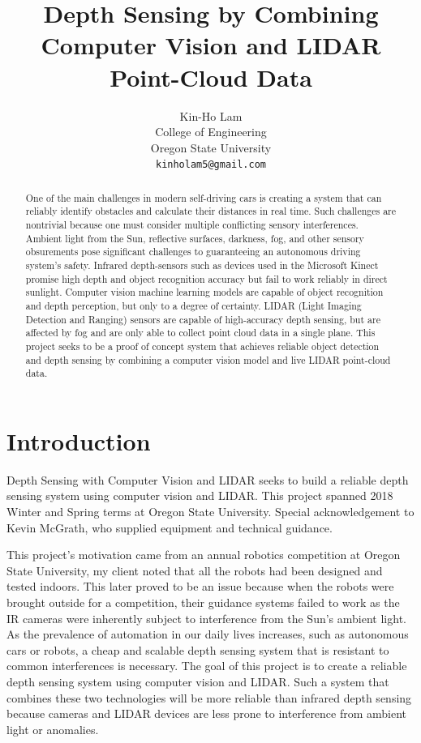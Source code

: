 \documentclass{article}
\title{Depth Sensing by Combining Computer Vision and LIDAR Point-Cloud Data}
\date{}
\author{
  Kin-Ho Lam\\
  College of Engineering\\
  Oregon State University \\
  \texttt{kinholam5@gmail.com}\\
}
\begin{document}
\maketitle

\begin{abstract}
  One of the main challenges in modern self-driving cars is creating a system that can reliably identify obstacles and calculate their distances in real time.
  Such challenges are nontrivial because one must consider multiple conflicting sensory interferences.
  Ambient light from the Sun, reflective surfaces, darkness, fog, and other sensory obsurements pose significant challenges to guaranteeing an autonomous driving system's safety.
  Infrared depth-sensors such as devices used in the Microsoft Kinect promise high depth and object recognition accuracy but fail to work reliably in direct sunlight.
  Computer vision machine learning models are capable of object recognition and depth perception, but only to a degree of certainty.
  LIDAR (Light Imaging Detection and Ranging) sensors are capable of high-accuracy depth sensing, but are affected by fog and are only able to collect point cloud data in a single plane.
  This project seeks to be a proof of concept system that achieves reliable object detection and depth sensing by combining a computer vision model and live LIDAR point-cloud data.
\end{abstract}



\section{Introduction}
    Depth Sensing with Computer Vision and LIDAR seeks to build a reliable depth sensing system using computer vision and LIDAR. 
		This project spanned 2018 Winter and Spring terms at Oregon State University.
		Special acknowledgement to Kevin McGrath, who supplied equipment and technical guidance.
		
		This project's motivation came from an annual robotics competition at Oregon State University, my client noted that all the robots had been designed and tested indoors.
		This later proved to be an issue because when the robots were brought outside for a competition, their guidance systems failed to work as the IR cameras were inherently subject to interference from the Sun's ambient light.
		As the prevalence of automation in our daily lives increases, such as autonomous cars or robots, a cheap and scalable depth sensing system that is resistant to common interferences is necessary.
		The goal of this project is to create a reliable depth sensing system using computer vision and LIDAR.
		Such a system that combines these two technologies will be more reliable than infrared depth sensing because cameras and LIDAR devices are less prone to interference from ambient light or anomalies.
\end{document}
